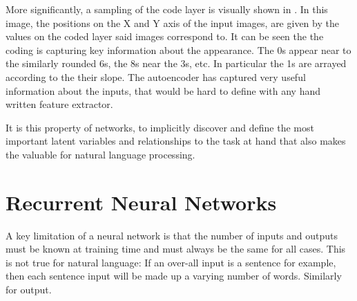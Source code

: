 \documentclass[12pt,parskip]{komatufte}
\begin{document}


More significantly, a sampling of the code layer is visually shown in .
In this image, the positions on the X and Y axis of the input images, are given by the values on the coded layer said images correspond to.
It can be seen the the coding is capturing key information about the appearance.
The 0s appear near to the similarly rounded 6s,
the 8s near the 3s, etc.
In particular the 1s are arrayed according to the their slope.
The autoencoder has captured very useful information about the inputs, that would be hard to define with any hand written feature extractor.

It is this property of networks, to implicitly discover and define the most important latent variables and relationships to the task at hand that also makes the valuable for natural language processing.





\section{Recurrent Neural Networks}\label{sec:rnn}

A key limitation of a neural network is that the number of inputs and outputs must be known at training time and must always be the same for all cases.
This is not true for natural language: If an over-all input is a sentence for example, then each sentence input will be made up a varying number of words. Similarly for output.
\end{document}
